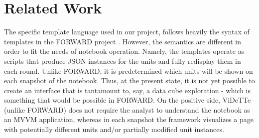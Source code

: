 \vspace*{-0.3cm}
\section{Related Work}
\label{section:related-work}


The specific template language used in our project, follows heavily the syntax of templates in the FORWARD project \cite{SIGMOD2010,CIDR2011}. However, the semantics are different in order to fit the needs of notebook operation. Namely, the templates operate as scripts that produce JSON instances for the units and fully redisplay them in each round. Unlike FORWARD, it is predetermined which units will be shown on each snapshot of the notebook. Thus, at the present state, it is not yet possible to create an interface that is tantamount to, say, a data cube exploration - which is something that would be possible in FORWARD. On the positive side, ViDeTTe (unlike FORWARD) does not require the analyst to understand the notebook as an MVVM application, whereas in each snapshot the framework visualizes a page with potentially different units and/or partially modified unit instances. 

